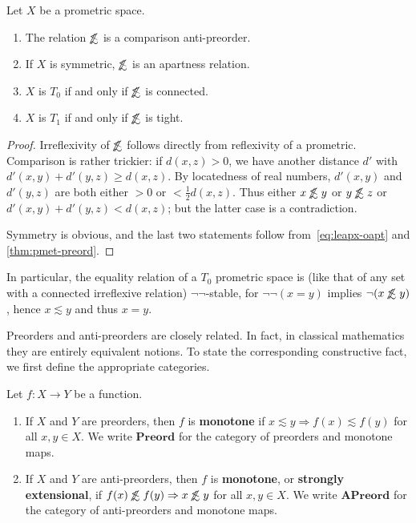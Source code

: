 \documentclass{article}
\def\oapt{\mathrel{\!\not\,\not\lesssim}}
\def\leapx{\lesssim}
\let\implies\Rightarrow
\def\nn{\ensuremath{\neg\neg}}
\def\Preord{\mathbf{Preord}}
\def\APreord{\mathbf{APreord}}
\begin{document}
\begin{thm}
  Let $X$ be a prometric space.
  \begin{enumerate}
  \item The relation $\oapt$ is a comparison anti-preorder.  
  \item If $X$ is symmetric, $\oapt$ is an apartness relation.
  \item $X$ is $T_0$ if and only if $\oapt$ is connected.
  \item $X$ is $T_1$ if and only if $\oapt$ is tight.
  \end{enumerate}
\end{thm}
\begin{proof}
  Irreflexivity of $\oapt $ follows directly from reflexivity of a prometric.
  Comparison is rather trickier: if $d(x,z)>0$, we have another distance $d'$ with $d'(x,y)+d'(y,z)\ge d(x,z)$.
  By locatedness of real numbers, $d'(x,y)$ and $d'(y,z)$ are both either $>0$ or $<\frac12 d(x,z)$.
  Thus either $x\oapt y$ or $y\oapt z$ or $d'(x,y)+d'(y,z) < d(x,z)$; but the latter case is a contradiction.

  Symmetry is obvious, and the last two statements follow from~\eqref{eq:leapx-oapt} and \cref{thm:pmet-preord}.
\end{proof}

In particular, the equality relation of a $T_0$ prometric space is (like that of any set with a connected irreflexive relation) \nn-stable, for $\neg\neg(x=y)$ implies $\neg(x\oapt y)$, hence $x\leapx y$ and thus $x=y$.

Preorders and anti-preorders are closely related.
In fact, in classical mathematics they are entirely equivalent notions.
To state the corresponding constructive fact, we first define the appropriate categories.

\begin{defn}
  Let $f:X\to Y$ be a function.
  \begin{enumerate}
  \item If $X$ and $Y$ are preorders, then $f$ is \textbf{monotone} if $x\leapx y \implies f(x)\leapx f(y)$ for all $x,y\in X$.
    We write $\Preord$ for the category of preorders and monotone maps.
  \item If $X$ and $Y$ are anti-preorders, then $f$ is \textbf{monotone}, or \textbf{strongly extensional}, if $f(x)\oapt f(y) \implies x\oapt y$ for all $x,y\in X$.
    We write $\APreord$ for the category of anti-preorders and monotone maps.
  \end{enumerate}
\end{defn}
\end{document}

